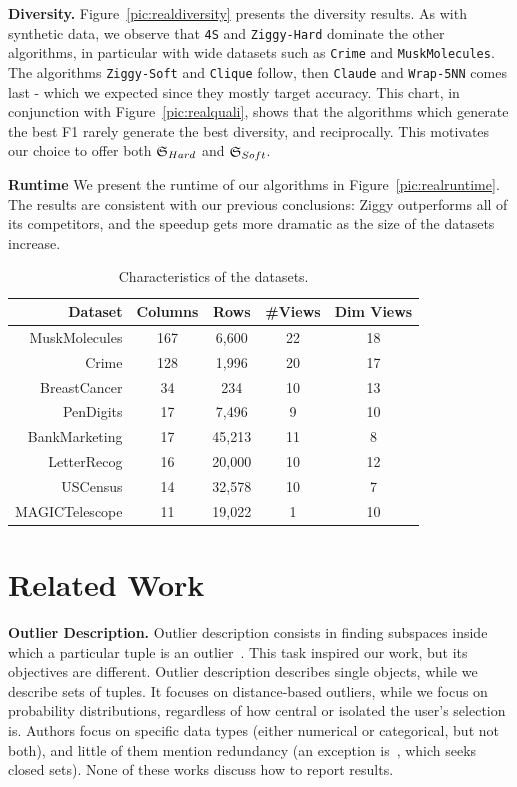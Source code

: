 \textbf{Diversity.} Figure~\ref{pic:realdiversity} presents the diversity
results.  As with synthetic data, we observe that \texttt{4S} and
\texttt{Ziggy-Hard} dominate the other algorithms, in particular with wide
datasets such as \texttt{Crime} and \texttt{MuskMolecules}. The algorithms
\texttt{Ziggy-Soft} and \texttt{Clique} follow, then \texttt{Claude} and
\texttt{Wrap-5NN} comes last - which we expected since they mostly target
accuracy. This chart, in conjunction with Figure~\ref{pic:realquali}, shows
that the algorithms which generate the best F1 rarely generate the best
diversity, and reciprocally. This motivates our choice to offer both
$\mathfrak{S}_{Hard}$ and $\mathfrak{S}_{Soft}$.

\textbf{Runtime} We present the runtime of our algorithms in
Figure~\ref{pic:realruntime}. The results are consistent with our previous
conclusions: Ziggy outperforms all of its competitors, and the speedup gets more
dramatic as the size of the datasets increase.

\begin{table}[!t]
    \centering
    \small
    \begin{tabular}{r c c c c} 
        \hline
        Dataset & Columns & Rows & \#Views & Dim Views\\
        \hline
        MuskMolecules & 167 & 6,600 & 22 & 18\\
        Crime & 128 & 1,996 & 20 & 17\\
        BreastCancer & 34 & 234 & 10 & 13\\
        PenDigits & 17 & 7,496 & 9 & 10\\
        BankMarketing & 17 & 45,213 & 11& 8\\
        LetterRecog & 16 & 20,000 & 10 & 12\\
        USCensus & 14 & 32,578 & 10 & 7\\
        MAGICTelescope & 11 & 19,022 & 1 & 10\\
        \hline
    \end{tabular}
    \caption{Characteristics of the datasets.}
    \label{tab:datasets}
\end{table}

\section{Related Work}
\label{sec:related-works}

\textbf{Outlier Description.} Outlier description consists in finding subspaces
inside which a particular tuple is an outlier~\cite{angiulli2009detecting,
duan2014mining,knorr1999finding,zhang2006detecting}. This task inspired our
work, but its objectives are different. Outlier description describes single
objects, while we describe sets of tuples.  It focuses on distance-based
outliers, while we focus on probability distributions, regardless of how
central or isolated the user's selection is.  Authors focus on specific data
types (either numerical or categorical, but not both), and little of them
mention redundancy (an exception is~\cite{duan2014mining}, which seeks closed
sets). None of these works discuss how to report results.

